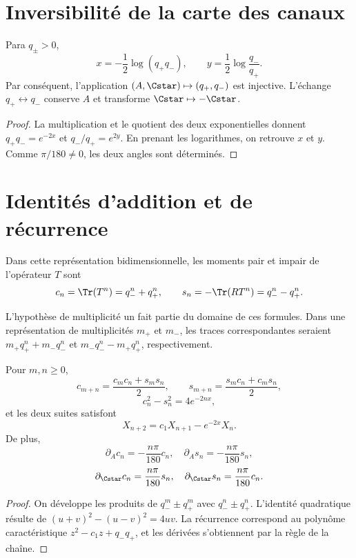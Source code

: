 \section{Inversibilité de la carte des canaux}

\begin{theorem}
Para \(q_\pm>0\),
\[
 x=-\frac12\log(q_+q_-),
 \qquad
 y=\frac12\log\frac{q_-}{q_+}.
\]
Par conséquent, l'application
\((A,\Cstar)\mapsto(q_+,q_-)\) est injective. L'échange
\(q_+\leftrightarrow q_-\) conserve \(A\) et transforme
\(\Cstar\mapsto-\Cstar\).
\end{theorem}
\begin{proof}
La multiplication et le quotient des deux exponentielles donnent
\(q_+q_-=e^{-2x}\) et \(q_-/q_+=e^{2y}\). En prenant les logarithmes, on retrouve
\(x\) et \(y\). Comme \(\pi/180\neq0\), les deux angles sont déterminés.
\end{proof}

\section{Identités d'addition et de récurrence}

Dans cette représentation bidimensionnelle, les moments pair et impair de l'opérateur
\(T\) sont
\[
 c_n=\Tr(T^n)=q_-^n+q_+^n,
 \qquad
 s_n=-\Tr(RT^n)=q_-^n-q_+^n.
\]

L'hypothèse de multiplicité un fait partie du domaine de ces formules.
Dans une représentation de multiplicités \(m_+\) et \(m_-\), les traces
correspondantes seraient
\(m_+q_+^n+m_-q_-^n\) et
\(m_-q_-^n-m_+q_+^n\), respectivement.

\begin{theorem}
Pour \(m,n\geq0\),
\[
 c_{m+n}=\frac{c_mc_n+s_ms_n}{2},
 \qquad
 s_{m+n}=\frac{s_mc_n+c_ms_n}{2},
\]
\[
 c_n^2-s_n^2=4e^{-2nx},
\]
et les deux suites satisfont
\[
 X_{n+2}=c_1X_{n+1}-e^{-2x}X_n.
\]
De plus,
\[
 \partial_Ac_n=-\frac{n\pi}{180}c_n,
 \quad
 \partial_As_n=-\frac{n\pi}{180}s_n,
\]
\[
 \partial_{\Cstar}c_n=\frac{n\pi}{180}s_n,
 \quad
 \partial_{\Cstar}s_n=\frac{n\pi}{180}c_n.
\]
\end{theorem}
\begin{proof}
On développe les produits de
\(q_-^m\pm q_+^m\) avec \(q_-^n\pm q_+^n\). L'identité quadratique résulte
de \((u+v)^2-(u-v)^2=4uv\). La récurrence correspond au polynôme
caractéristique \(z^2-c_1z+q_-q_+\), et les dérivées s'obtiennent par la
règle de la chaîne.
\end{proof}

